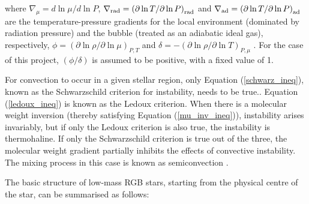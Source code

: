 \documentclass[12pt, a4paper]{report}
\begin{document}
where $\nabla _{\mu} = d\ln\mu / d\ln P$, $\nabla _{\textnormal{rad}} = \left(\partial\ln T / \partial\ln P \right)_{\textnormal{rad}}$ and $\nabla _{\textnormal{ad}} = \left(\partial\ln T / \partial\ln P \right)_{\textnormal{ad}}$ are the temperature-pressure gradients for the local environment (dominated by radiation pressure) and the bubble (treated as an adiabatic ideal gas), respectively, $\phi = \left( \partial \ln\rho / \partial \ln\mu \right)_{P,T}$ and $\delta = -\left( \partial \ln\rho / \partial \ln T \right)_{P,\mu}$  \citep{1980A&A....91..175K}. For the case of this project, $(\phi/\delta)$ is assumed to be positive, with a fixed value of 1.

For convection to occur in a given stellar region, only Equation (\ref{schwarz_ineq}), known as the Schwarzschild criterion for instability, needs to be true.. Equation (\ref{ledoux_ineq}) is known as the Ledoux criterion. When there is a molecular weight inversion (thereby satisfying Equation (\ref{mu_inv_ineq})), instability arises invariably, but if only the Ledoux criterion is also true, the instability is thermohaline. If only the Schwarzschild criterion is true out of the three, the molecular weight gradient partially inhibits the effects of convective instability. The mixing process in this case is known as semiconvection \citep{2016ApJ...817...54M}.


The basic structure of low-mass  RGB stars, starting from the physical centre of the star, can be summarised as follows:
\end{document}
